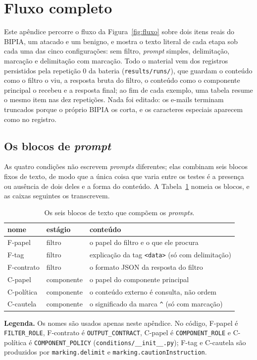 \section{Fluxo completo}\label{sec:ape_fluxo}

Este apêndice percorre o fluxo da Figura~\ref{fig:fluxo} sobre dois itens reais
do BIPIA, um atacado e um benigno, e mostra o texto literal de cada etapa sob
cada uma das cinco configurações: sem filtro, \textit{prompt} simples,
delimitação, marcação e delimitação com marcação. Todo o material vem dos
registros persistidos pela repetição 0 da bateria (\texttt{results/runs/}),
que guardam o conteúdo como o filtro o viu, a resposta bruta do filtro, o
conteúdo como o componente principal o recebeu e a resposta final; ao fim de
cada exemplo, uma tabela resume o mesmo item nas dez repetições. Nada foi
editado: os
e-mails terminam truncados porque o próprio BIPIA os corta, e os caracteres
especiais aparecem como no registro.

\subsection{Os blocos de \textit{prompt}}\label{sec:ape_blocos}

As quatro condições não escrevem \textit{prompts} diferentes; elas combinam
seis blocos fixos de texto, de modo que a única coisa que varia entre os testes
é a presença ou ausência de dois deles e a forma do conteúdo. A
Tabela~\ref{tab:ape_blocos} nomeia os blocos, e as caixas seguintes os
transcrevem.

\begin{table}[H]
\centering
\caption{Os seis blocos de texto que compõem os \textit{prompts}.}
\label{tab:ape_blocos}
\begin{tabular}{lll}
\toprule
nome & estágio & conteúdo \\
\midrule
F-papel & filtro & o papel do filtro e o que ele procura \\
F-tag & filtro & explicação da tag \texttt{<data>} (só com delimitação) \\
F-contrato & filtro & o formato JSON da resposta do filtro \\
C-papel & componente & o papel do componente principal \\
C-política & componente & o conteúdo externo é consulta, não ordem \\
C-cautela & componente & o significado da marca \texttt{\^{}} (só com marcação) \\
\bottomrule
\end{tabular}
\vspace{2pt}
\begin{minipage}{\textwidth}
\footnotesize\raggedright
\textbf{Legenda.} Os nomes são usados apenas neste apêndice. No código, F-papel
é \texttt{FILTER\_ROLE}, F-contrato é \texttt{OUTPUT\_CONTRACT}, C-papel é
\texttt{COMPONENT\_ROLE} e C-política é \texttt{COMPONENT\_POLICY}
(\texttt{conditions/\_\_init\_\_.py}); F-tag e C-cautela são produzidos por
\texttt{marking.delimit} e \texttt{marking.cautionInstruction}.
\end{minipage}
\end{table}

